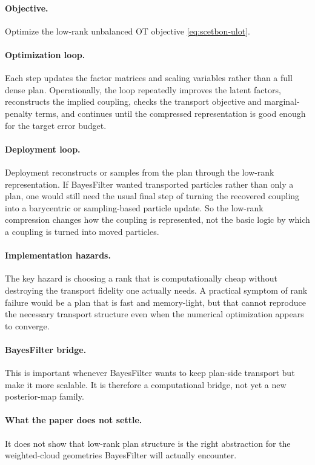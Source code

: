 \documentclass[11pt]{report}
\begin{document}
\paragraph{Objective.}
Optimize the low-rank unbalanced OT objective \eqref{eq:scetbon-ulot}.

\paragraph{Optimization loop.}
Each step updates the factor matrices and scaling variables rather than a full dense
plan.  Operationally, the loop repeatedly improves the latent factors, reconstructs
the implied coupling, checks the transport objective and marginal-penalty terms, and
continues until the compressed representation is good enough for the target error
budget.

\paragraph{Deployment loop.}
Deployment reconstructs or samples from the plan through the low-rank
representation.  If BayesFilter wanted transported particles rather than only a plan,
one would still need the usual final step of turning the recovered coupling into a
barycentric or sampling-based particle update.  So the low-rank compression changes
how the coupling is represented, not the basic logic by which a coupling is turned
into moved particles.

\paragraph{Implementation hazards.}
The key hazard is choosing a rank that is computationally cheap without destroying
the transport fidelity one actually needs.  A practical symptom of rank failure would
be a plan that is fast and memory-light, but that cannot reproduce the necessary
transport structure even when the numerical optimization appears to converge.

\paragraph{BayesFilter bridge.}
This is important whenever BayesFilter wants to keep plan-side transport but make it
more scalable.  It is therefore a computational bridge, not yet a new posterior-map
family.

\paragraph{What the paper does not settle.}
It does not show that low-rank plan structure is the right abstraction for the
weighted-cloud geometries BayesFilter will actually encounter.
\end{document}
